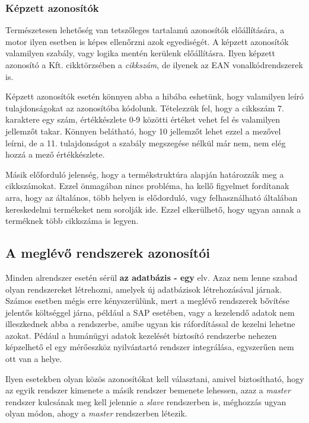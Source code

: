 \documentclass[a4paper,12pt]{report}
\begin{document}
\subsubsection{Képzett azonosítók}
Természetesen lehetőség van tetszőleges tartalamú azonosítók előállítására, a 
motor ilyen esetben is képes ellenőrzni azok egyediségét. A képzett azonosítók 
valamilyen szabály, vagy logika mentén kerülenk előállításra. Ilyen képzett 
azonosító a Kft. cikktörzsében a \textit{cikkszám}, de ilyenek az EAN 
vonalkódrendszerek is.

Képzett azonosítók esetén könnyen abba a hibába eshetünk, hogy valamilyen leíró
tulajdonságokat az azonosítóba kódolunk. Tételezzük fel, hogy a cikkszám 7.
karaktere egy szám, értékkészlete 0-9 közötti értéket vehet fel és valamilyen 
jellemzőt takar. Könnyen belátható, hogy 10 jellemzőt lehet ezzel a mezővel 
leírni, de a 11. tulajdonságot a szabály megszegése nélkül már nem, nem elég 
hozzá a mező értékkészlete.

Másik előforduló jelenség, hogy a termékstruktúra alapján határozzák meg a 
cikkszámokat. Ezzel önmagában nincs probléma, ha kellő figyelmet fordítanak 
arra, hogy az általános, több helyen is elődorduló, vagy felhasználható 
általában kereskedelmi termékeket nem sorolják ide. Ezzel elkerülhető, 
hogy ugyan annak a terméknek több cikkszáma is legyen.

\subsection{A meglévő rendszerek azonosítói}

Minden alrendszer esetén sérül \textbf{az adatbázis - egy} elv. Azaz nem lenne 
szabad olyan rendszereket létrehozni, amelyek új adatbázisok létrehozásával 
járnak. Számos esetben mégis erre kényszerülünk, mert a meglévő rendszerek 
bővítése jelentős költséggel járna, például a SAP esetében, vagy a kezelendő 
adatok nem illeszkednek abba a rendszerbe, amibe ugyan kis ráfordítással de 
kezelni lehetne azokat. Pédául a humánügyi adatok kezelését biztosító 
rendszerbe nehezen képzelhető el egy mérőeszköz nyilvántartó rendszer 
integrálása, egyszerűen nem ott van a helye.

Ilyen esetekben olyan közös azonosítókat kell választani, amivel biztosítható,
hogy az egyik rendszer kimenete a másik rendszer bemenete lehessen, azaz a 
\textit{master} rendszer kulcsának meg kell jelennie a \textit{slave} 
rendszerben is, méghozzás ugyan olyan módon, ahogy a \textit{master} 
rendszerben létezik. 
\end{document}
